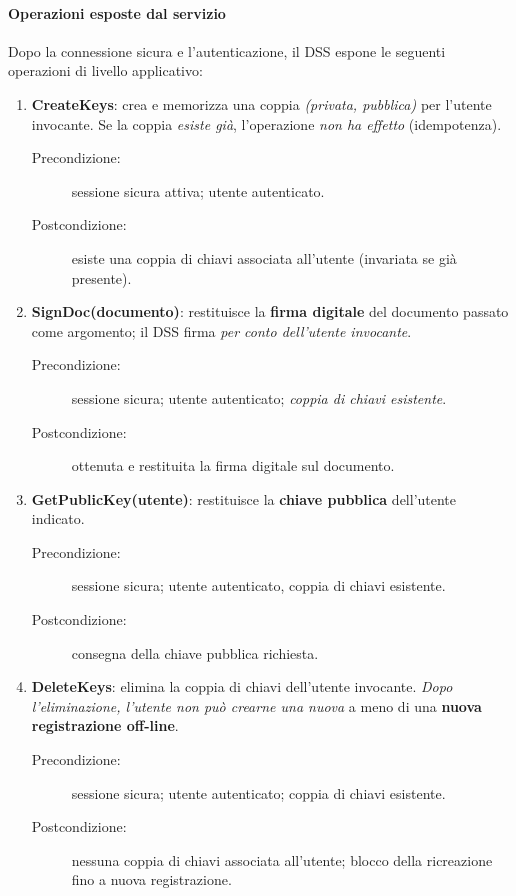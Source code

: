 \paragraph{Operazioni esposte dal servizio}
Dopo la connessione sicura e l'autenticazione, il DSS espone le seguenti operazioni di livello
applicativo:
\begin{enumerate}
  \item \textbf{CreateKeys}: crea e memorizza una coppia \emph{(privata, pubblica)} per l'utente
        invocante. Se la coppia \emph{esiste già}, l'operazione \emph{non ha effetto} (idempotenza).
        \begin{description}
          \item[Precondizione:] sessione sicura attiva; utente autenticato.
          \item[Postcondizione:] esiste una coppia di chiavi associata all'utente (invariata se già presente).
        \end{description}

  \item \textbf{SignDoc(documento)}: restituisce la \textbf{firma digitale} del documento passato
        come argomento; il DSS firma \emph{per conto dell'utente invocante}.
        \begin{description}
          \item[Precondizione:] sessione sicura; utente autenticato; \emph{coppia di chiavi esistente}.
          \item[Postcondizione:] ottenuta e restituita la firma digitale sul documento.
        \end{description}

  \item \textbf{GetPublicKey(utente)}: restituisce la \textbf{chiave pubblica} dell'utente indicato.
        \begin{description}
          \item[Precondizione:] sessione sicura; utente autenticato, coppia di chiavi esistente.
          \item[Postcondizione:] consegna della chiave pubblica richiesta.
        \end{description}

  \item \textbf{DeleteKeys}: elimina la coppia di chiavi dell'utente invocante. \emph{Dopo
        l'eliminazione, l'utente non può crearne una nuova} a meno di una \textbf{nuova
        registrazione off-line}.
        \begin{description}
          \item[Precondizione:] sessione sicura; utente autenticato; coppia di chiavi esistente.
          \item[Postcondizione:] nessuna coppia di chiavi associata all'utente; blocco della ricreazione fino a nuova registrazione.
        \end{description}
\end{enumerate}

